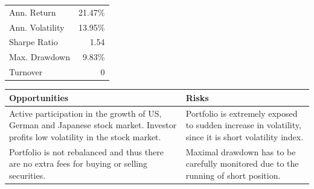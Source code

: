 \documentclass[11pt, parskip=full, DIV=14, headings=small, footsepline, footinclude=false, headsepline]{scrreprt}
\begin{document}
\vspace{\abovedisplayskip}
\begin{minipage}{0.65\textwidth}
\end{minipage}
\begin{minipage}{0.35\textwidth}
\begin{tabular}{lr}
\toprule
Ann. Return & 21.47\%\\
Ann. Volatility & 13.95\%\\
Sharpe Ratio & 1.54 \\
Max. Drawdown & 9.83\% \\
Turnover & 0\\
\bottomrule
\end{tabular}
\end{minipage}

\begin{table}[H]
\begin{tabularx}{\textwidth}{XX}
  \toprule
  \textbf{\textsf{Opportunities}} & \textbf{\textsf{Risks}} \\
  \midrule
Active participation in the growth of US, German and Japanese stock market. Investor profits low volatility in the stock market. &
Portfolio is extremely exposed to sudden increase in volatility, since it is short volatility index.\\[1em]
Portfolio is not rebalanced and thus there are no extra fees for buying or selling securities. &
Maximal drawdown has to be carefully monitored due to the running of short position.\\
  \bottomrule
\end{tabularx}
\end{table}
\end{document}
